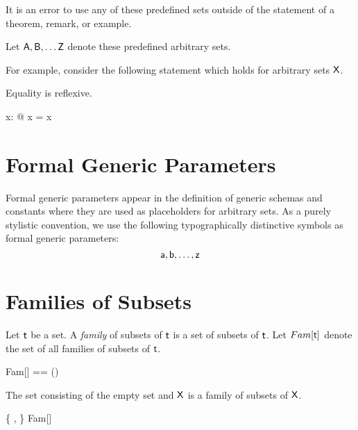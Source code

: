\documentclass{amsart}
\begin{document}
It is an error to use any of these predefined sets outside of the statement of a theorem, remark, or example.

Let $\mathsf{A}, \mathsf{B}, \dots \mathsf{Z}$ denote these predefined arbitrary sets.

\begin{zed}
	[\setA, \setB, \setC, \setD, \setE, \setF, \setG, \setH, \setI, \setJ, \setK, \setL, \setM, 
	\setN, \setO, \setP, \setQ, \setR, \setS, \setT, \setU, \setV, \setW, \setX, \setY, \setZ]
\end{zed}

For example, consider the following statement which holds for arbitrary sets $\mathsf{X}$.

\begin{remark}
Equality is reflexive.
\begin{zed}
	\forall x: \setX @ x = x
\end{zed}
\end{remark}

\section{Formal Generic Parameters}

Formal generic parameters appear in the definition of generic schemas and constants where
they are used as placeholders for arbitrary sets.
As a purely stylistic convention, we use the following typographically distinctive symbols as formal generic parameters:
\begin{equation*}
	\mathsf{a}, \mathsf{b}, \dots, \mathsf{z}
\end{equation*}

\section{Families of Subsets}

Let $\mathsf{t}$ be a set.
A \textit{family} of subsets of $\mathsf{t}$ is a set of subsets of $\mathsf{t}$.
Let $Fam[\mathsf{t}]$ denote the set of all families of subsets of $\mathsf{t}$.

\begin{zed}
	Fam[\genT] == \power(\power \genT)
\end{zed}

\begin{example}
The set consisting of the empty set and $\mathsf{X}$ is a family of subsets of $\mathsf{X}$.
\begin{zed}
	\{ \emptyset, \setX \} \in Fam[\setX]
\end{zed}
\end{example}
\end{document}
